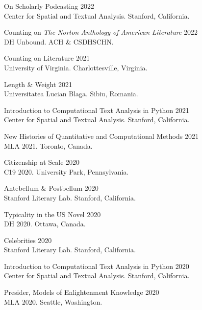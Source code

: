 \documentclass[
  12pt,
  letterpaper,
]{article}
\begin{document}
On Scholarly Podcasting \hfill 2022\\
\hspace*{0.333em} Center for Spatial and Textual Analysis. Stanford,
California.

Counting on \emph{The Norton Anthology of American Literature}
\hfill 2022\\
\hspace*{0.333em} DH Unbound. ACH \& CSDH\textbar SCHN.

Counting on Literature \hfill 2021\\
\hspace*{0.333em} University of Virginia. Charlottesville, Virginia.

Length \& Weight \hfill 2021\\
\hspace*{0.333em} Universitatea Lucian Blaga. Sibiu, Romania.

Introduction to Computational Text Analysis in Python \hfill 2021\\
\hspace*{0.333em} Center for Spatial and Textual Analysis. Stanford,
California.

New Histories of Quantitative and Computational Methods \hfill 2021\\
\hspace*{0.333em} MLA 2021. Toronto, Canada.

Citizenship at Scale \hfill 2020\\
\hspace*{0.333em} C19 2020. University Park, Pennsylvania.

Antebellum \& Postbellum \hfill 2020\\
\hspace*{0.333em} Stanford Literary Lab. Stanford, California.

Typicality in the US Novel \hfill 2020\\
\hspace*{0.333em} DH 2020. Ottawa, Canada.

Celebrities \hfill 2020\\
\hspace*{0.333em} Stanford Literary Lab. Stanford, California.

Introduction to Computational Text Analysis in Python \hfill 2020\\
\hspace*{0.333em} Center for Spatial and Textual Analysis. Stanford,
California.

Presider, Models of Enlightenment Knowledge \hfill 2020\\
\hspace*{0.333em} MLA 2020. Seattle, Washington.
\end{document}
